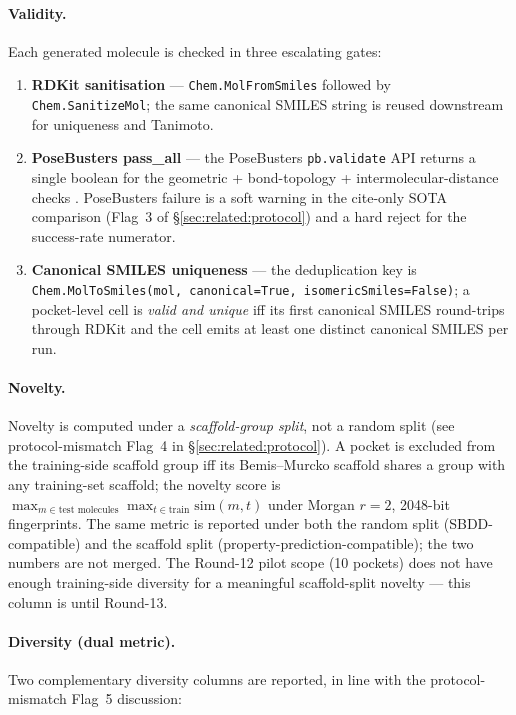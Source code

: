 \paragraph{Validity.}
Each generated molecule is checked in three escalating gates:

\begin{enumerate}
  \item \textbf{RDKit sanitisation} --- \texttt{Chem.MolFromSmiles}
        followed by \texttt{Chem.SanitizeMol}; the same canonical
        SMILES string is reused downstream for uniqueness and
        Tanimoto.
  \item \textbf{PoseBusters pass\_all} --- the PoseBusters
        \texttt{pb.validate} API returns a single boolean for the
        geometric + bond-topology + intermolecular-distance checks
        \cite{buttenschoen2024posebusters}. PoseBusters failure is
        a soft warning in the cite-only SOTA comparison (Flag~3 of
        \S\ref{sec:related:protocol}) and a hard reject for the
        success-rate numerator.
  \item \textbf{Canonical SMILES uniqueness} --- the deduplication
        key is \texttt{Chem.MolToSmiles(mol, canonical=True,
        isomericSmiles=False)}; a pocket-level cell is \emph{valid
        and unique} iff its first canonical SMILES round-trips
        through RDKit and the cell emits at least one distinct
        canonical SMILES per run.
\end{enumerate}

\paragraph{Novelty.}
Novelty is computed under a \emph{scaffold-group split}, not a random
split (see protocol-mismatch Flag~4 in
\S\ref{sec:related:protocol}). A pocket is excluded from the
training-side scaffold group iff its Bemis--Murcko scaffold shares a
group with any training-set scaffold; the novelty score is
$\max_{m\in\text{test molecules}} \max_{t\in\text{train}} \mathrm{sim}(m,t)$
under Morgan $r{=}2$, 2048-bit fingerprints. The same metric is
reported under both the random split (SBDD-compatible) and the
scaffold split (property-prediction-compatible); the two numbers are
not merged. The Round-12 pilot scope (10 pockets) does not have
enough training-side diversity for a meaningful scaffold-split
novelty --- this column is \DESIGN{} until Round-13.

\paragraph{Diversity (dual metric).}
Two complementary diversity columns are reported, in line with the
protocol-mismatch Flag~5 discussion:

